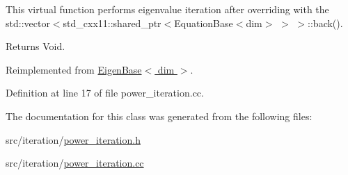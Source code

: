 This virtual function performs eigenvalue iteration after overriding with the std\+::vector$<$std\+\_\+cxx11\+::shared\+\_\+ptr$<$Equation\+Base$<$dim$>$ $>$ $>$\+::back().

\begin{DoxyReturn}{Returns}
Void. 
\end{DoxyReturn}


Reimplemented from \hyperlink{class_eigen_base_ae09830ed4bcb14b7b699cd5f5460fab7}{Eigen\+Base$<$ dim $>$}.



Definition at line 17 of file power\+\_\+iteration.\+cc.



The documentation for this class was generated from the following files\+:\begin{DoxyCompactItemize}
\item 
src/iteration/\hyperlink{power__iteration_8h}{power\+\_\+iteration.\+h}\item 
src/iteration/\hyperlink{power__iteration_8cc}{power\+\_\+iteration.\+cc}\end{DoxyCompactItemize}
